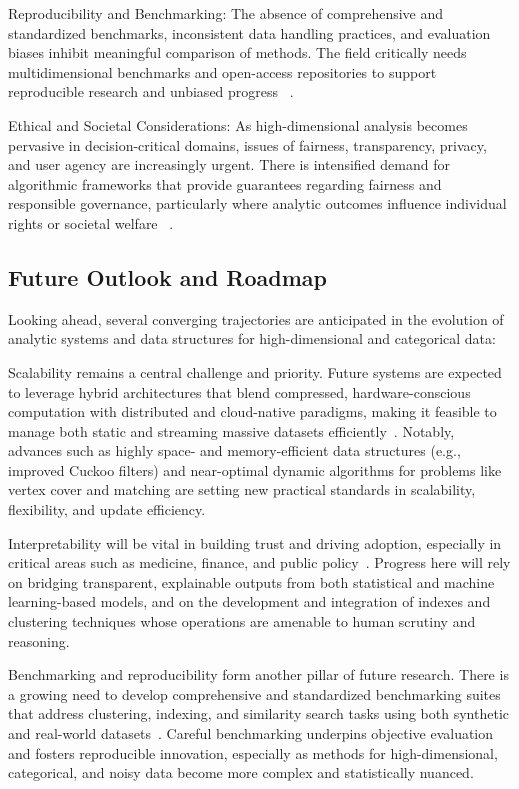 \documentclass[sigconf]{acmart}
\begin{document}
Reproducibility and Benchmarking: The absence of comprehensive and standardized benchmarks, inconsistent data handling practices, and evaluation biases inhibit meaningful comparison of methods. The field critically needs multidimensional benchmarks and open-access repositories to support reproducible research and unbiased progress ~\cite{ref110,ref116}.

Ethical and Societal Considerations: As high-dimensional analysis becomes pervasive in decision-critical domains, issues of fairness, transparency, privacy, and user agency are increasingly urgent. There is intensified demand for algorithmic frameworks that provide guarantees regarding fairness and responsible governance, particularly where analytic outcomes influence individual rights or societal welfare ~\cite{ref117,ref118}.

\subsection{Future Outlook and Roadmap}

Looking ahead, several converging trajectories are anticipated in the evolution of analytic systems and data structures for high-dimensional and categorical data:

Scalability remains a central challenge and priority. Future systems are expected to leverage hybrid architectures that blend compressed, hardware-conscious computation with distributed and cloud-native paradigms, making it feasible to manage both static and streaming massive datasets efficiently~\cite{ref84,ref87}. Notably, advances such as highly space- and memory-efficient data structures (e.g., improved Cuckoo filters) and near-optimal dynamic algorithms for problems like vertex cover and matching are setting new practical standards in scalability, flexibility, and update efficiency.

Interpretability will be vital in building trust and driving adoption, especially in critical areas such as medicine, finance, and public policy~\cite{ref110,ref116}. Progress here will rely on bridging transparent, explainable outputs from both statistical and machine learning-based models, and on the development and integration of indexes and clustering techniques whose operations are amenable to human scrutiny and reasoning.

Benchmarking and reproducibility form another pillar of future research. There is a growing need to develop comprehensive and standardized benchmarking suites that address clustering, indexing, and similarity search tasks using both synthetic and real-world datasets~\cite{ref116}. Careful benchmarking underpins objective evaluation and fosters reproducible innovation, especially as methods for high-dimensional, categorical, and noisy data become more complex and statistically nuanced.
\end{document}
